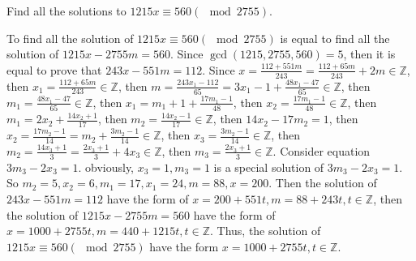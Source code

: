 \documentclass{ctexart}
\newif\ifpreface
\begin{document}
\large
\setlength{\baselineskip}{1.2em}
\ifpreface

\else
{}
\begin{problem}\label{pro:1}
  Find all the solutions to \(1215x \equiv 560(\mod 2755)\).
\end{problem}
\begin{solution}
  To find all the solution of \(1215x \equiv 560 (\mod 2755)\) is equal to find all the solution of
  \(1215x-2755m=560\).
  Since \(\gcd(1215,2755,560)=5\), then it is equal to prove that \(243x-551m=112\).
  Since \(x=\frac{112 + 551m}{243}=\frac{112 + 65 m}{243} + 2m \in \mathbb{Z}\), then
  \(x_1=\frac{112 + 65m}{243} \in \mathbb{Z}\), then \(m=\frac{243x_1-112}{65}=3x_1-1+\frac{48x_1-47}{65} \in \mathbb{Z}\),
  then \(m_1=\frac{48x_1-47}{65} \in \mathbb{Z}\), then \(x_1=m_1 + 1 + \frac{17m_1 - 1}{48}\),
  then \(x_2=\frac{17m_1 - 1}{48} \in \mathbb{Z}\), then \(m_1=2x_2 + \frac{14x_2+1}{17}\),
  then \(m_2=\frac{14x_2-1}{17} \in \mathbb{Z}\), then \(14x_2-17m_2=1\),
  then \(x_2=\frac{17m_2 - 1}{14}=m_2 + \frac{3m_2 - 1}{14} \in \mathbb{Z}\), then \(x_3=\frac{3m_2 - 1}{14} \in \mathbb{Z}\),
  then \(m_2=\frac{14x_3 +1}{3}=\frac{2x_3+1}{3} + 4x_3 \in \mathbb{Z}\),
  then \(m_3=\frac{2x_3+1}{3} \in \mathbb{Z}\). Consider equation \(3m_3-2x_3=1\).
  obviously, \(x_3=1,m_3=1\) is a special solution of \(3m_3-2x_3=1\).
  So \(m_2=5, x_2=6,m_1=17,x_1=24,m=88,x=200\).
  Then the solution of \(243x-551m=112\) have the form of \(x=200 + 551t,m=88 + 243t,t \in \mathbb{Z}\),
  then the solution of \(1215x-2755m=560\) have the form of \(x=1000 + 2755t, m=440 + 1215t, t \in \mathbb{Z}\).
  Thus, the solution of \(1215x \equiv 560 (\mod 2755)\) have the form \(x=1000 + 2755t, t \in \mathbb{Z}\).
\end{solution}
\end{document}
